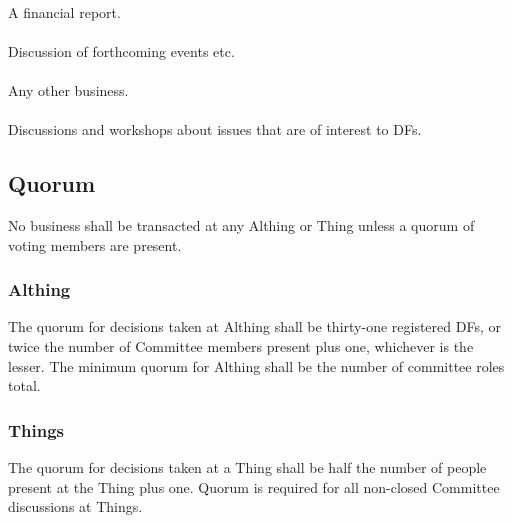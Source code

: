 \documentclass[a4paper, 11pt]{report}
\begin{document}
\paragraph{}
A financial report.
\paragraph{}
Discussion of forthcoming events etc.
\paragraph{}
Any other business.
\paragraph{}
Discussions and workshops about issues that are of interest to DFs.

\subsection{Quorum}
\label{sec:quorum}
No business shall be transacted at any Althing or Thing unless a quorum of voting
members are present.
\subsubsection{Althing} The quorum for decisions taken at Althing shall be thirty-one registered DFs, or twice the number of Committee members present plus one, whichever is the lesser. The minimum quorum for Althing shall be the number of committee roles total.
\subsubsection{Things} The quorum for decisions taken at a Thing shall be half the number of people present at the Thing plus one. Quorum is required for all non-closed Committee discussions at Things.
\end{document}
